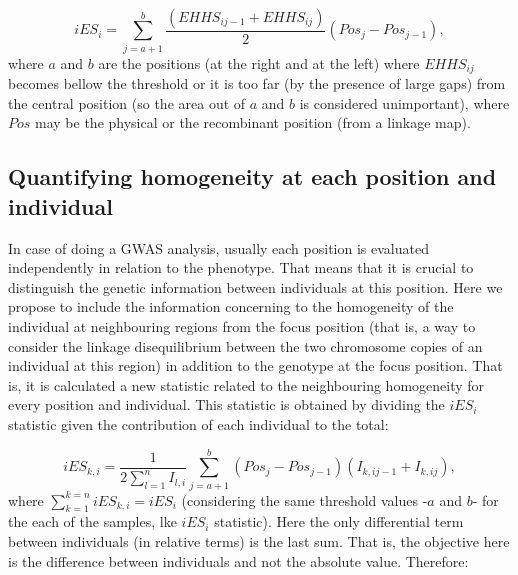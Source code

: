 \documentclass[a4paper,11pt]{article}
\begin{document}
 \begin{equation}
 iES_i = \sum_{j=a+1}^{b}\frac{(EHHS_{ij-1} + EHHS_{ij})}{2} (Pos_{j} - Pos_{j-1}),
 \end{equation}
where $a$ and $b$ are the positions (at the right and at the left) where $EHHS_{ij}$ becomes bellow the threshold or it is too far (by the presence of large gaps) from the central position (so the area out of $a$ and $b$ is considered unimportant), where $Pos$ may be the physical or the recombinant position (from a linkage map).
 
 \subsection{Quantifying homogeneity at each position and individual}
 
In case of doing a GWAS analysis, usually each position is evaluated independently in relation to the phenotype. That means that it is crucial to distinguish the genetic information between individuals at this position. Here we propose to include the information concerning to the homogeneity of the individual at neighbouring regions from the focus position (that is, a way to consider the linkage disequilibrium between the two chromosome copies of an individual at this region) in addition to the genotype at the focus position. That is, it is calculated a new statistic related to the neighbouring homogeneity for every position and individual. This statistic is obtained by dividing the $iES_i$ statistic given the contribution of each individual to the total:

 \begin{equation}
 iES_{k,i} = \frac{1}{2\sum_{l=1}^{n}I_{l,i}} \sum_{j=a+1}^{b} (Pos_{j} - Pos_{j-1}) (I_{k,ij-1} + I_{k,ij}),
 \end{equation}
where $\sum_{k=1}^{k=n}iES_{k,i}=iES_i$ (considering the same threshold values -$a$ and $b$- for the each of the samples, lke $iES_i$ statistic). Here the only differential term between individuals (in relative terms) is the last sum. %
That is, the objective here is the difference between individuals and not the absolute value. Therefore:

\end{document}
